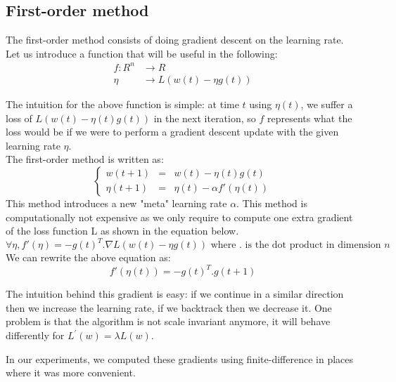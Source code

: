 \documentclass{article}
\begin{document}
  \subsection{First-order method}
  
  The first-order method consists of doing gradient descent on the learning rate.\\ 
  Let us introduce a function that will be useful in the following:\\
  \begin{align}
  f : R^{n} &\rightarrow R\\
  \eta &\rightarrow L(w(t)-\eta g(t))
  \end{align}
  
  The intuition for the above function is simple: at time $t$ using $\eta(t)$, we suffer a loss of $L(w(t) - \eta(t)g(t))$ in the next iteration, so $f$ represents what the loss would be if we were to perform a gradient descent update with the given learning rate $\eta$.\\
  The first-order method is written as:\\
  $$
  \left\{
  \begin{array}{lll}
  w(t+1) & = & w(t) -\eta(t)g(t)\\
  \eta(t+1) & = & \eta(t) - \alpha f'(\eta(t))
  \end{array}
  \right.
  $$
  This method introduces a new "meta" learning rate $\alpha$. This method is computationally not expensive as we only require to compute one extra gradient of the loss function L as shown in the equation below. \\
  \begin{equation}
  \forall \eta, f'(\eta) = -g(t)^{T}.\nabla L(w(t)-\eta g(t)) \text{ where . is the dot product in dimension $n$}
  \end{equation}
  We can rewrite the above equation as: \\
  \begin{equation}
  f'(\eta(t)) = -g(t)^{T}.g(t+1)
  \end{equation}
  
  The intuition behind this gradient is easy: if we continue in a similar direction then we increase the learning rate, if we backtrack then we decrease it. One
  problem is that the algorithm is not scale invariant anymore, it will behave
  differently for $L^{'}(w) = \lambda L(w)$.
  
  In our experiments, we computed these gradients using finite-difference in places where it was more convenient.
  
\end{document}
